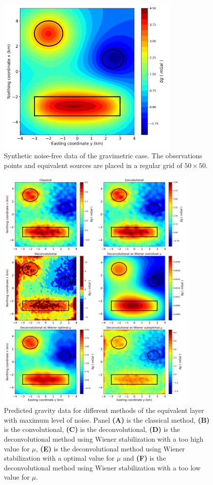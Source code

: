 \begin{figure}[htbp]
	\begin{center}
		\includegraphics[width=9cm]{Fig/synthetic_grav}
	\end{center}
	\caption{Synthetic noise-free data of the gravimetric case. The observations points and equivalent sources are placed in a regular grid of $50 \times 50$.}
	\label{fig:4}
\end{figure}

\begin{figure}[htbp]
	\begin{center}
		\includegraphics[width=10cm]{Fig/stability_grav_comparison}
	\end{center}
	\caption{Predicted gravity data for different methods of the equivalent layer with maximum level of noise. Panel \textbf{(A)} is the classical method, \textbf{(B)} is the convolutional, \textbf{(C)} is the deconvolutional, \textbf{(D)} is the deconvolutional method using Wiener stabilization with a too high value for $\mu$, \textbf{(E)} is the deconvolutional method using Wiener stabilization with a optimal value for $\mu$ and \textbf{(F)} is the deconvolutional method using Wiener stabilization with a too low value for $\mu$.}
	\label{fig:5}
\end{figure}

